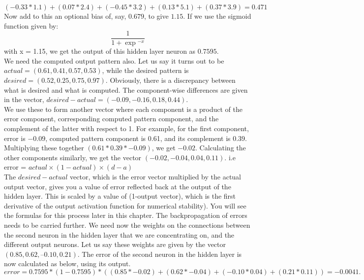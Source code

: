 \documentclass[12pt, right open]{memoir}
\begin{document}
$(-0.33 * 1.1) + (0.07 * 2.4) + (-0.45 * 3.2) + (0.13 * 5.1)
+ (0.37 * 3.9) = 0.471$\\

Now add to this an optional bias of, say, $0.679$, to give $1.15$. 
If we use the sigmoid function given by:
\[
 \frac{1}{1+\exp{^{-x}}}
\]
with x = 1.15, we get the output of this hidden layer neuron as $0.7595$.\\

We need the computed output pattern also. Let us say it turns out to be $actual = (0.61, 0.41, 0.57, 0.53)$, while the desired pattern is $desired = (0.52, 0.25, 0.75, 0.97)$. Obviously, there is a discrepancy between what is desired and what is computed. The component-wise differences are given in the vector, $desired - actual = (-0.09, -0.16, 0.18, 0.44)$.\\

We use these to form another vector where each component is a product of the error component, corresponding computed pattern component, and the complement of the latter with respect to 1. For example, for the first component, error is $-0.09$, computed pattern component is 0.61, and its complement is 0.39. Multiplying these together $(0.61*0.39*-0.09)$, we get $-0.02$. Calculating the other components similarly, we get the vector $(-0.02, -0.04, 0.04, 0.11)$.  i.e  error = $actual \times (1 - actual) \times (d - a)$ \\

The $desired-actual$ vector, which is the error vector multiplied by the actual output vector, gives you a value of error reflected back at the output of the hidden layer. This is scaled by a value of (1-output vector), which is the first derivative of the output activation function for numerical stability). You will see the
formulas for this process later in this chapter. The backpropagation of errors needs to be carried further. We need now the weights on the connections between the second neuron in the hidden layer that we are concentrating on, and the different output neurons. Let us say these weights are given by the vector $(0.85, 0.62, –0.10, 0.21)$. The error of the second neuron in the hidden layer is now calculated as below, using its output.\\

$error = 0.7595 * (1 - 0.7595) * ( (0.85 * -0.02) + (0.62 * -0.04)
+ ( -0.10 * 0.04) + (0.21 * 0.11)) = -0.0041.$\\
\end{document}
